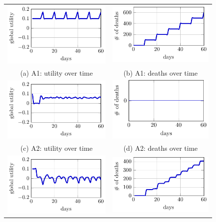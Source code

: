 \begin{figure}[htb]
    \centering
    \begin{tabular}{cc}
    \includegraphics[width=0.3\linewidth]{008_team_6_agent_design/A/SOMAS_A1_utility.pdf} &   \includegraphics[width=0.3\linewidth]{008_team_6_agent_design/A/SOMAS_A1_deaths.pdf} \\[0pt]
    (a) A1: utility over time & (b) A1: deaths over time \\[8pt]
     \includegraphics[width=0.3\linewidth]{008_team_6_agent_design/A/SOMAS_A2_utility.pdf} &   \includegraphics[width=0.3\linewidth]{008_team_6_agent_design/A/SOMAS_A2_deaths.pdf} \\[0pt]
    (c) A2: utility over time & (d) A2: deaths over time
    \\[8pt]
     \includegraphics[width=0.3\linewidth]{008_team_6_agent_design/A/SOMAS_A3_utility.pdf} &   \includegraphics[width=0.3\linewidth]{008_team_6_agent_design/A/SOMAS_A3_deaths.pdf} \\[0pt]

\end{tabular}
\end{figure}
